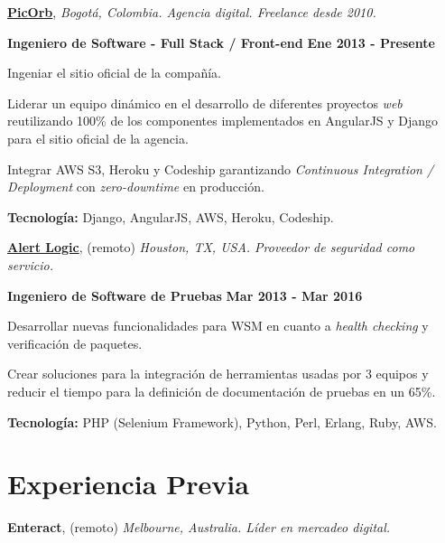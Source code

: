  
\href{http://www.picorb.com/}{\textbf{PicOrb}}, \textit{Bogotá, Colombia.
Agencia digital. Freelance desde 2010.}
\begin{outerlist}
\item[\FA \faAngleDoubleRight] \textbf{Ingeniero de Software -
Full Stack / Front-end}
\hfill
\textbf{Ene 2013 - Presente}
\end{outerlist}
    \begin{innerlist}
\item Ingeniar el sitio oficial de la compa\~n\'ia.
\item Liderar un equipo din\'amico en el desarrollo de
diferentes proyectos \textit{web} reutilizando 100\% de los componentes
implementados en AngularJS y Django para el sitio oficial de la agencia.
\item Integrar AWS S3, Heroku y Codeship garantizando \textit{Continuous
Integration / Deployment} con \textit{zero-downtime} en producción.
\item \textbf{Tecnología:} Django, AngularJS, AWS, Heroku, Codeship.
    \end{innerlist}
    
\quarterblankline

\href{http://alertlogic.com/}{\textbf{Alert Logic}}, (remoto) \textit{Houston,
TX, USA.
Proveedor de seguridad como servicio.}
\begin{outerlist}
\item[\FA \faAngleDoubleRight] \textbf{Ingeniero de Software de Pruebas} \hfill
\textbf{Mar 2013 - Mar 2016}
\end{outerlist}

    \begin{innerlist}
\item Desarrollar nuevas funcionalidades para WSM en cuanto a
\textit{health checking} y verificaci\'on de paquetes.
\item Crear soluciones para la integraci\'on de herramientas usadas
por 3 equipos y reducir el tiempo para la definici\'on de
documentaci\'on de pruebas en un 65\%.
\item \textbf{Tecnología:} PHP (Selenium Framework), Python, Perl, Erlang,
Ruby, AWS.
    \end{innerlist}


\section{Experiencia Previa}
%
\textbf{Enteract}, (remoto)
\textit{Melbourne, Australia. Líder en mercadeo digital.}

